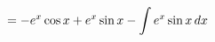\documentclass[preview]{standalone}
\begin{document}
\begin{align*}
\special{dvisvgm:raw <g id='unique000'>}= -e^x \cos x + e^x \sin x - \int e^x \sin x \, dx\special{dvisvgm:raw </g>}
\end{align*}
\end{document}
